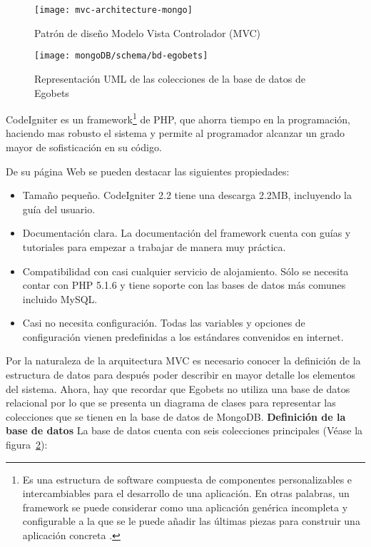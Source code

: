 \begin{figure}[!htb]\centering
   \begin {minipage}{1\textwidth}
     \texttt{[image: mvc-architecture-mongo]}
     \caption{Patrón de diseño Modelo Vista Controlador (MVC)}\label{Fig:mvc}
   \end{minipage}
\end{figure}

	\begin{figure}[!htb]\centering
	   \begin {minipage}{1\textwidth}
	     \texttt{[image: mongoDB/schema/bd-egobets]}
	     \caption{Representación UML de las colecciones de la base de datos de Egobets}\label{Fig:db-egobets}
	   \end{minipage}
	\end{figure}

CodeIgniter es un framework\footnote{Es una estructura de software compuesta de componentes personalizables e intercambiables para el desarrollo de una aplicación. En otras palabras, un framework se puede considerar como una aplicación genérica incompleta y configurable a la que se le puede añadir las últimas piezas para construir una aplicación concreta \cite{upton2007codeigniter}.} de PHP, que ahorra tiempo en la programación, haciendo mas robusto el sistema y permite al programador alcanzar un grado mayor de sofisticación en su código.

	De su página Web \cite{codeigniterWeb} se pueden destacar las siguientes propiedades:
	\begin{itemize}
		\item Tamaño pequeño. CodeIgniter 2.2 tiene una descarga 2.2MB, incluyendo la guía del usuario.
		\item Documentación clara. La documentación del framework cuenta con guías y tutoriales para empezar a trabajar de manera muy práctica.
		\item Compatibilidad con casi cualquier servicio de alojamiento. Sólo se necesita contar con PHP 5.1.6 y tiene soporte con las bases de datos más comunes incluido MySQL.
		\item Casi no necesita configuración. Todas las variables y opciones de configuración vienen predefinidas a los estándares convenidos en internet.

	\end{itemize}


	Por la naturaleza de la arquitectura MVC es necesario conocer la definición de la estructura de datos para después poder describir en mayor detalle los elementos del sistema. Ahora, hay que recordar que Egobets no utiliza una base de datos relacional por lo que se presenta un diagrama de clases para representar las colecciones que se tienen en la base de datos de MongoDB.
	\textbf{Definición de la base de datos}
	La base de datos cuenta con seis colecciones principales (Véase la figura~\ref{Fig:db-egobets}):

